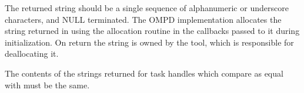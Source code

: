 \descr
The returned string should be a single sequence of alphanumeric or underscore characters, and 
NULL terminated. The OMPD implementation allocates the string returned in 
using the allocation routine in the callbacks passed to it during initialization. On return the string is 
owned by the tool, which is responsible for deallocating it.

The contents of the strings returned for task handles which compare as equal with
 must be the same.

\argdesc

\crossreferences
